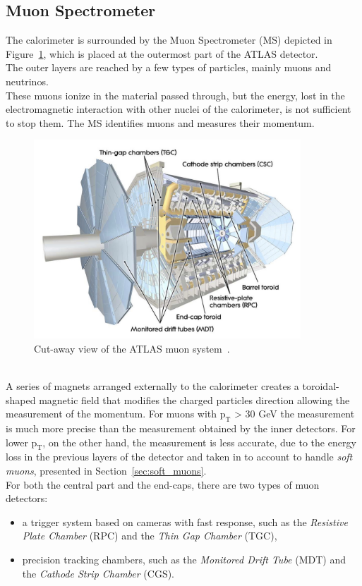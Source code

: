 \FloatBarrier
\subsection{Muon Spectrometer}
\label{sec:MuonSpec}
The calorimeter is surrounded by the Muon Spectrometer (MS) depicted in Figure~\ref{fig:MS}, which is placed at the outermost part of the ATLAS detector.\\
The outer layers are reached by a few types of particles, mainly muons and neutrinos.\\
These muons ionize  in the material passed through, but the energy, lost in the electromagnetic interaction
with other nuclei of the calorimeter, is not sufficient to stop them. 
The MS  identifies muons and measures their momentum.
\begin{figure}[h]
	\centering
	\includegraphics[width=10cm]{Chapters/CH2/figures/MS}
	\caption{Cut-away view of the ATLAS muon system~\cite{ATLAS}.}
	\label{fig:MS}
\end{figure}
\\A series of magnets arranged externally to the calorimeter creates a toroidal-shaped magnetic field that modifies the charged particles direction allowing the measurement of the momentum.
For muons with $\mathrm{p_T}$ > 30 GeV the measurement is much more precise than the measurement obtained by the inner detectors. 
For lower $\mathrm{p_T}$, on the other hand, the measurement is less accurate, due to the 
energy loss in the previous layers of the detector and taken in to account to handle \textit{soft muons}, presented in Section~\ref{sec:soft_muons}.\\
For both the central part and the end-caps,  there are two types of muon detectors:
\begin{itemize}
	\item a trigger system based on cameras with fast response, such as the \textit{Resistive Plate Chamber} (RPC) and the \textit{Thin Gap Chamber} (TGC), 
	\item precision tracking chambers, such as the \textit{Monitored Drift Tube} (MDT) and the \textit{Cathode Strip Chamber} (CGS).
\end{itemize}
